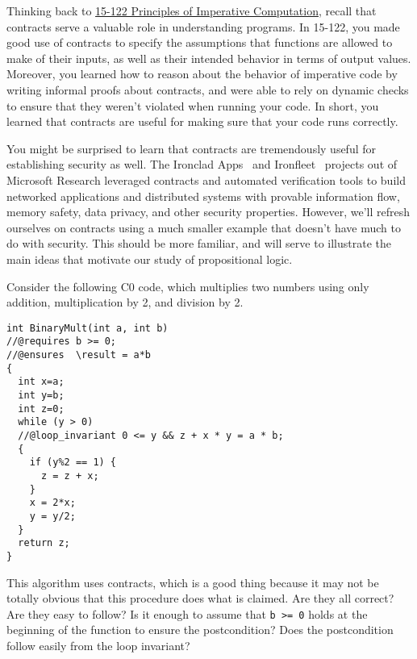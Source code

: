 \documentclass[11pt,twoside]{scrartcl}
\begin{document}
Thinking back to \href{http://www.cs.cmu.edu/~15122/}{15-122 Principles of Imperative Computation}, recall that contracts serve a valuable role in understanding programs. In 15-122, you made good use of contracts to specify the assumptions that functions are allowed to make of their inputs, as well as their intended behavior in terms of output values. Moreover, you learned how to reason about the behavior of imperative code by writing informal proofs about contracts, and were able to rely on dynamic checks to ensure that they weren't violated when running your code. In short, you learned that contracts are useful for making sure that your code runs correctly.

You might be surprised to learn that contracts are tremendously useful for establishing security as well. The Ironclad Apps~\cite{Hawblitzel2014} and Ironfleet~\cite{Hawblitzel2015} projects out of Microsoft Research leveraged contracts and automated verification tools to build networked applications and distributed systems with provable information flow, memory safety, data privacy, and other security properties. However, we'll refresh ourselves on contracts using a much smaller example that doesn't have much to do with security. This should be more familiar, and will serve to illustrate the main ideas that motivate our study of propositional logic.

Consider the following C0 code, which multiplies two numbers using only addition, multiplication by 2, and division by 2.

\begin{lstlisting}[basicstyle=\small,style=customjava]
int BinaryMult(int a, int b)
//@requires b >= 0;
//@ensures  \result = a*b
{
  int x=a;
  int y=b;
  int z=0;
  while (y > 0)
  //@loop_invariant 0 <= y && z + x * y = a * b;
  {
    if (y%2 == 1) {
      z = z + x;
    }
    x = 2*x;
    y = y/2;
  }
  return z;
}
\end{lstlisting}

This algorithm uses contracts, which is a good thing because it may not be totally obvious that this procedure does what is claimed.
Are they all correct?
Are they easy to follow?
Is it enough to assume that \verb'b >= 0' holds at the beginning of the function to ensure the postcondition?
Does the postcondition follow easily from the loop invariant?
\end{document}
